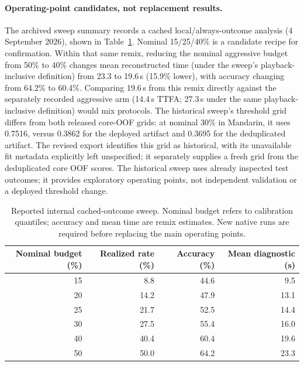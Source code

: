 \paragraph{Operating-point candidates, not replacement results.}
The archived sweep summary records a cached local/always-outcome
analysis (4 September 2026), shown in
Table~\ref{tab:threshold-candidates}.
Nominal 15/25/40\% is a candidate recipe for confirmation. Within
that same remix, reducing the nominal aggressive budget from 50\%
to 40\% changes mean reconstructed time (under the sweep's
playback-inclusive definition) from 23.3 to 19.6\,s
(15.9\% lower), with accuracy changing from 64.2\% to 60.4\%.
Comparing 19.6\,s from this remix directly against the separately
recorded aggressive arm (14.4\,s TTFA; 27.3\,s under the same
playback-inclusive definition) would mix protocols. The historical sweep's
threshold grid differs from both released core-OOF grids: at nominal
30\% in Mandarin, it uses 0.7516, versus 0.3862 for the deployed
artifact and 0.3695 for the deduplicated artifact. The revised export
identifies this grid as historical, with its unavailable fit metadata
explicitly left unspecified; it separately supplies a fresh grid from
the deduplicated core OOF scores. The historical sweep uses already
inspected test outcomes; it provides exploratory operating points,
not independent validation or a deployed threshold change.

\begin{table}[h]
\centering\small
\caption{Reported internal cached-outcome sweep. Nominal budget refers
 to calibration quantiles; accuracy and mean time are remix estimates.
 New native runs are required before replacing the main operating points.}
\label{tab:threshold-candidates}
\begin{tabular}{rrrr}
\toprule
Nominal budget (\%) & Realized rate (\%) & Accuracy (\%) & Mean diagnostic (s)\\
\midrule
15 & 8.8 & 44.6 & 9.5\\
20 & 14.2 & 47.9 & 13.1\\
25 & 21.7 & 52.5 & 14.4\\
30 & 27.5 & 55.4 & 16.0\\
40 & 40.4 & 60.4 & 19.6\\
50 & 50.0 & 64.2 & 23.3\\
\bottomrule
\end{tabular}
\end{table}

